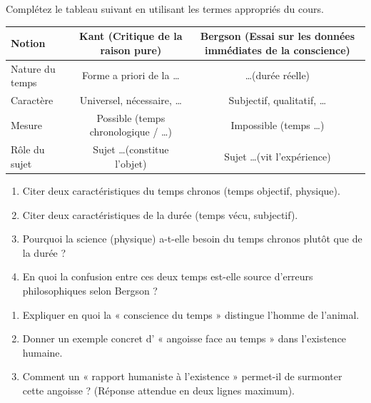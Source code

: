 \documentclass[11pt]{article}
\begin{document}
\begin{exercice}
Complétez le tableau suivant en utilisant les termes appropriés du cours.

\begin{tabular}{|l|c|c|}
\hline
\textbf{Notion} & \textbf{Kant (Critique de la raison pure)} & \textbf{Bergson (Essai sur les données immédiates de la conscience)} \\
\hline
Nature du temps & Forme a priori de la \ldots & \ldots (durée réelle) \\
\hline
Caractère & Universel, nécessaire, \ldots & Subjectif, qualitatif, \ldots \\
\hline
Mesure & Possible (temps chronologique / \ldots) & Impossible (temps \ldots) \\
\hline
Rôle du sujet & Sujet \ldots (constitue l'objet) & Sujet \ldots (vit l'expérience) \\
\hline
\end{tabular}
\end{exercice}

\begin{exercice}
\begin{enumerate}
    \item Citer deux caractéristiques du temps chronos (temps objectif, physique).
    \item Citer deux caractéristiques de la durée (temps vécu, subjectif).
    \item Pourquoi la science (physique) a-t-elle besoin du temps chronos plutôt que de la durée ?
    \item En quoi la confusion entre ces deux temps est-elle source d'erreurs philosophiques selon Bergson ?
\end{enumerate}
\end{exercice}

\begin{exercice}
\begin{enumerate}
    \item Expliquer en quoi la « conscience du temps » distingue l'homme de l'animal.
    \item Donner un exemple concret d' « angoisse face au temps » dans l'existence humaine.
    \item Comment un « rapport humaniste à l'existence » permet-il de surmonter cette angoisse ? (Réponse attendue en deux lignes maximum).
\end{enumerate}
\end{exercice}
\end{document}
